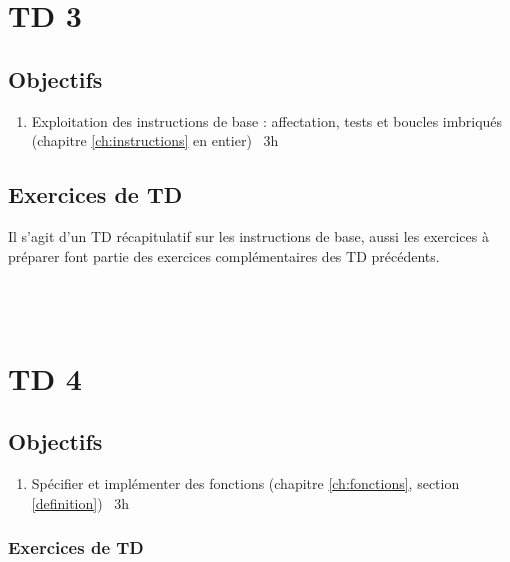 \section*{TD 3}\label{td3}
\subsection*{Objectifs}
\begin{enumerate}
\item Exploitation des instructions de base : affectation, tests et boucles imbriqués
	(chapitre \ref{ch:instructions} en entier)
	\dotfill\ {\color{blue}3h}\mbox{}
\end{enumerate}

\subsection*{Exercices de TD}
{\footnotesize\noindent Il s'agit d'un TD récapitulatif sur les instructions de base, aussi les exercices à
préparer font partie des exercices complémentaires des TD précédents.}
\vspace*{3mm}

\noindent 
{}\\
\\


\section*{TD 4}\label{td4}
\subsection*{Objectifs}
\begin{enumerate}
\item Spécifier et implémenter des fonctions
	(chapitre \ref{ch:fonctions}, section \ref{definition})
	\dotfill\ {\color{blue}3h}\mbox{}
\end{enumerate}

\subsubsection*{Exercices de TD}
\noindent 
{}\\
\\
\\
\\

